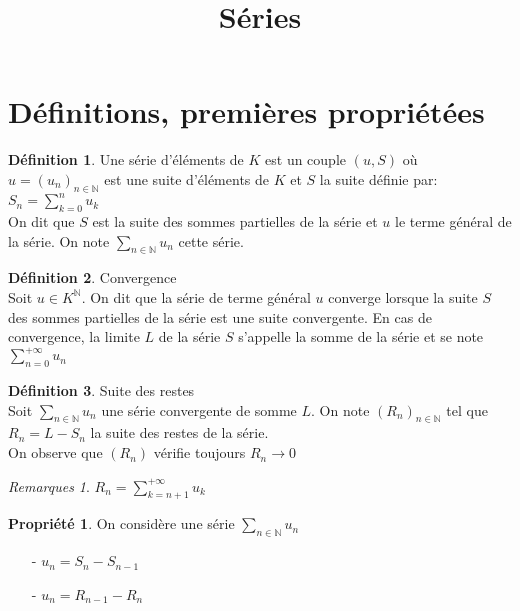 \documentclass[fleqn]{article}
\title{S\'eries}
\date{}
\theoremstyle{definition} \newtheorem*{defi}{D\'efinition}
\theoremstyle{definition} \newtheorem*{theo}{Th\'eor\`eme}
\theoremstyle{definition} \newtheorem*{coro}{Corollaire}
\theoremstyle{remark} \newtheorem*{rqs}{Remarques}
\theoremstyle{definition} \newtheorem*{prop}{Propri\'et\'e}
\begin{document}
\maketitle

\section{D\'efinitions, premi\`eres propri\'et\'ees}

\begin{defi} Une s\'erie d'\'el\'ements de $K$ est un couple $(u,S)$ o\`u $u = (u_n)_{n \in \mathbb{N}}$ est une suite d'\'el\'ements de $K$ et
$S$ la suite d\'efinie par: $S_n = \sum_{k=0}^n u_k$\\
On dit que $S$ est la suite des sommes partielles de la s\'erie et $u$ le terme g\'en\'eral de la s\'erie. On note $\sum_{n \in \mathbb{N}} u_n$
cette s\'erie.
\end{defi}

\begin{defi} Convergence \\
Soit $u \in K^{\mathbb{N}}$. On dit que la s\'erie de terme g\'en\'eral $u$ converge lorsque la suite $S$ des sommes partielles de la s\'erie
est une suite convergente. En cas de convergence, la limite $L$ de la s\'erie $S$ s'appelle la somme de la s\'erie et se note
$\sum_{n=0}^{+\infty} u_n$
\end{defi}

\begin{defi} Suite des restes \\
	Soit $\sum_{n \in \mathbb{N}} u_n$ une s\'erie convergente de somme $L$. On note $(R_n)_{n \in \mathbb{N}}$ tel que $R_n = L - S_n$ la suite
	des restes de la s\'erie.\\
	On observe que $(R_n)$ v\'erifie toujours $R_n \rightarrow 0$

	\begin{rqs}
		$R_n = \sum_{k = n+1}^{+\infty} u_k$
	\end{rqs}
\end{defi}

\begin{prop} On consid\`ere une s\'erie $\sum_{n \in \mathbb{N}} u_n$
	\begin{enumerate}
		\item [-] $u_n = S_n - S_{n-1}$
		\item [-] $u_n = R_{n-1} - R_n$
	\end{enumerate}
\end{prop}
\end{document}
